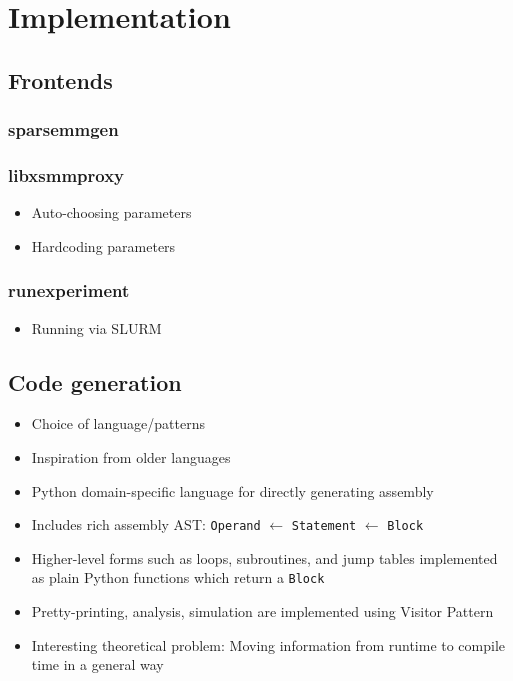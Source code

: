 \chapter{Implementation}
\label{chapter:implementation}

\section{Frontends}
\subsection{sparsemmgen}
\subsection{libxsmmproxy}
\begin{itemize}
	\item Auto-choosing parameters
	\item Hardcoding parameters
\end{itemize}
\subsection{runexperiment}
\begin{itemize}
	\item Running via SLURM
\end{itemize}


\section{Code generation}
\begin{itemize}
	\item Choice of language/patterns
	\item Inspiration from older languages
\end{itemize}

\begin{itemize}
    \item Python domain-specific language for directly generating assembly
    \item Includes rich assembly AST: \texttt{Operand} $\leftarrow$ \texttt{Statement} $\leftarrow$ \texttt{Block} 
    \item Higher-level forms such as loops, subroutines, and jump tables
          implemented as plain Python functions which return a \texttt{Block}
    \item Pretty-printing, analysis, simulation are implemented using Visitor Pattern
    \item Interesting theoretical problem: Moving information from runtime to compile time in a general way
\end{itemize}

